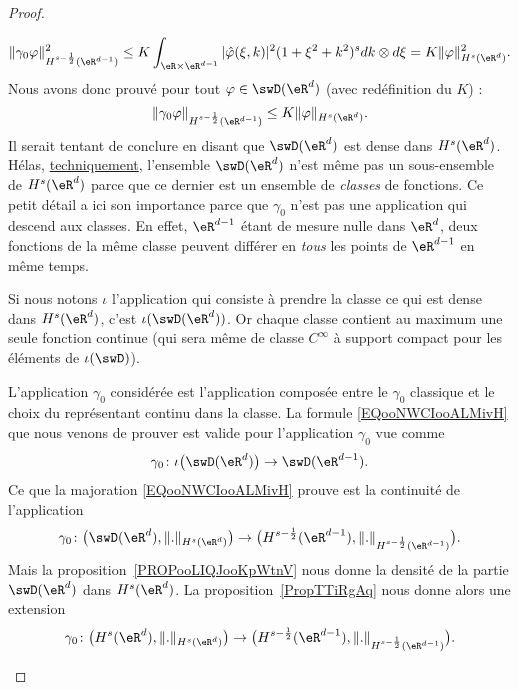 \begin{proof}
\begin{subproof}
		\begin{equation}
			\| \gamma_0\varphi \|^2_{H^{s-\frac{ 1 }{2}}(\eR^{d-1})}\leq K\int_{\eR\times \eR^{d-1}} |\hat \varphi(\xi,k) |^2(1+\xi^2+k^2)^sdk\otimes d\xi=K\| \varphi \|^2_{H^s(\eR^d)}.
		\end{equation}
		Nous avons donc prouvé pour tout \( \varphi\in\swD(\eR^d)\) (avec redéfinition du \( K\)) :
		\begin{equation}        \label{EQooNWCIooALMivH}
			\| \gamma_0\varphi \|_{H^{s-\frac{ 1 }{2}}(\eR^{d-1})}\leq K\| \varphi \|_{H^s(\eR^d)}.
		\end{equation}
		Il serait tentant de conclure en disant que \( \swD(\eR^d)\) est dense dans \( H^s(\eR^d)\). Hélas, \href{https://explosm.net/comics/3613/}{techniquement}, l'ensemble \( \swD(\eR^d)\) n'est même pas un sous-ensemble de \( H^s(\eR^d)\) parce que ce dernier est un ensemble de \emph{classes} de fonctions. Ce petit détail a ici son importance parce que \( \gamma_0\) n'est pas une application qui descend aux classes. En effet, \( \eR^{d-1}\) étant de mesure nulle dans \( \eR^d\), deux fonctions de la même classe peuvent différer en \emph{tous} les points de \( \eR^{d-1}\) en même temps.

		Si nous notons \( \iota\) l'application qui consiste à prendre la classe ce qui est dense dans \( H^s(\eR^d)\), c'est \( \iota(\swD(\eR^d))\). Or chaque classe contient au maximum une seule fonction continue (qui sera même de classe \(  C^{\infty}\) à support compact pour les éléments de \( \iota(\swD)\)).

		L'application \( \gamma_0\) considérée est l'application composée entre le \( \gamma_0\) classique et le choix du représentant continu dans la classe. La formule \eqref{EQooNWCIooALMivH} que nous venons de prouver est valide pour l'application \( \gamma_0\) vue comme
		\begin{equation}
			\gamma_0\colon \iota\big( \swD(\eR^d) \big)\to \swD(\eR^{d-1}).
		\end{equation}
		Ce que la majoration \eqref{EQooNWCIooALMivH} prouve est la continuité de l'application
		\begin{equation}
			\gamma_0\colon \big( \swD(\eR^d),\| . \|_{H^s(\eR^d)} \big)\to \big( H^{s-\frac{ 1 }{2}}(\eR^{d-1}),\| . \|_{H^{s-\frac{ 1 }{2}}(\eR^{d-1})} \big).
		\end{equation}
		Mais la proposition~\ref{PROPooLIQJooKpWtnV} nous donne la densité de la partie \( \swD(\eR^d)\) dans \( H^s(\eR^d)\). La proposition~\ref{PropTTiRgAq} nous donne alors une extension
		\begin{equation}
			\gamma_0\colon \big(   H^s(\eR^d), \| . \|_{H^s(\eR^d)}   \big)\to \big( H^{s-\frac{ 1 }{2}}(\eR^{d-1}),\| . \|_{H^{s-\frac{ 1 }{2}}(\eR^{d-1})} \big).
		\end{equation}
	\end{subproof}
\end{proof}


